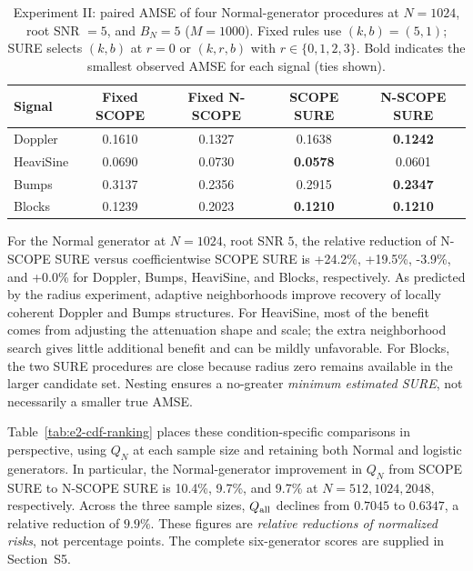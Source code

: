 \begin{table}[tbp]
\centering\small
\caption{Experiment II: paired AMSE of four Normal-generator procedures at $N=1024$, root SNR $=5$, and $B_N=5$ ($M=1000$). Fixed rules use $(k,b)=(5,1)$; SURE selects $(k,b)$ at $r=0$ or $(k,r,b)$ with $r\in\{0,1,2,3\}$. Bold indicates the smallest observed AMSE for each signal (ties shown).}
\label{tab:e2-normal}
\setlength{\tabcolsep}{5pt}
\begin{tabular}{lcccc}
\toprule
Signal & Fixed SCOPE & Fixed N-SCOPE & SCOPE SURE & N-SCOPE SURE \\
\midrule
Doppler & 0.1610 & 0.1327 & 0.1638 & \textbf{0.1242} \\
HeaviSine & 0.0690 & 0.0730 & \textbf{0.0578} & 0.0601 \\
Bumps & 0.3137 & 0.2356 & 0.2915 & \textbf{0.2347} \\
Blocks & 0.1239 & 0.2023 & \textbf{0.1210} & \textbf{0.1210} \\
\bottomrule
\end{tabular}
\end{table}

For the Normal generator at $N=1024$, root SNR $5$, the relative
reduction of N-SCOPE SURE versus coefficientwise SCOPE SURE is
+24.2\%, +19.5\%, -3.9\%, and +0.0\%
for Doppler, Bumps, HeaviSine, and Blocks, respectively.
As predicted by the radius experiment, adaptive neighborhoods improve
recovery of locally coherent Doppler and Bumps structures. For
HeaviSine, most of the benefit comes from adjusting the attenuation
shape and scale; the extra neighborhood search gives little additional
benefit and can be mildly unfavorable. For Blocks, the two SURE
procedures are close because radius zero remains available in the
larger candidate set. Nesting ensures a no-greater \emph{minimum
estimated SURE}, not necessarily a smaller true AMSE.

Table~\ref{tab:e2-cdf-ranking} places these condition-specific
comparisons in perspective, using $Q_N$ at each sample size and retaining
both Normal and logistic generators. In particular, the Normal-generator
improvement in $Q_N$ from SCOPE SURE to N-SCOPE SURE is
10.4\%, 9.7\%, and 9.7\% at $N=512,1024,2048$, respectively.
Across the three sample sizes, $Q_{\rm all}$ declines from $0.7045$ to $0.6347$, a relative reduction of $9.9\%$. These figures are
\emph{relative reductions of normalized risks}, not percentage points.
The complete six-generator scores are supplied in Section~S5.

